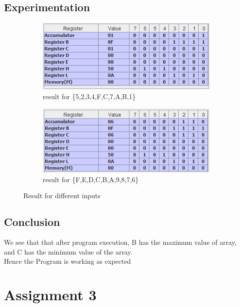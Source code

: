 \documentclass[a4paper]{article} %
\begin{document}
\subsection{Experimentation}
\begin{figure}[h!]
    \centering
    \begin{subfigure}[b]{0.4\linewidth}
        \centering
        \includegraphics[width=\linewidth]{Assignment 1/2_min-max-10-elem/test 1.png}
        \caption{result for \{5,2,3,4,F,C,7,A,B,1\}}
        \label{fg2a}
    \end{subfigure}
    \begin{subfigure}[b]{0.4\linewidth}
        \centering
        \includegraphics[width=\linewidth]{Assignment 1/2_min-max-10-elem/test 2.png}
        \caption{result for \{F,E,D,C,B,A,9,8,7,6\}}
        \label{fg2b}
    \end{subfigure}
    \caption{Result for different inputs}
    \label{fg2}
\end{figure}
\subsection{Conclusion}
We see that that after program execution, B has the maximum value of array, and C has the minimum value of the array.\\
Hence the Program is working as expected
\newpage

\section[Delay Procedure]{Assignment 3} %
\end{document}
